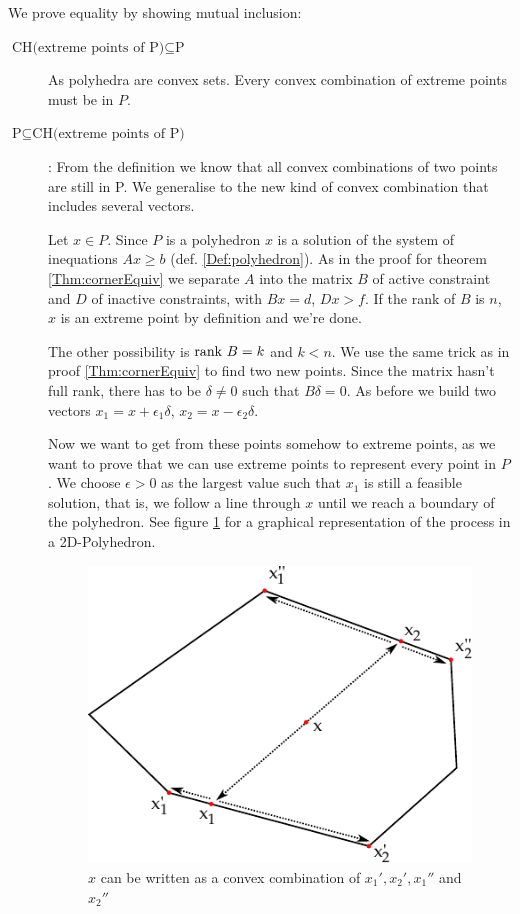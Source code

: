 \begin{pr} We prove equality by showing mutual inclusion:
\begin{description}
\item[$\text{CH(extreme points of P)} \subseteq \text{P}$] As polyhedra are convex sets. Every convex combination of extreme points must be in $P$.\\ 
\item[$\text{P} \subseteq \text{CH(extreme points of P)}$]:  From the definition we know that all convex combinations of two points are still in P. We generalise to the new kind of convex combination that includes several vectors. 

Let $x\in P$. Since $P$ is a polyhedron $x$ is a solution of the system of inequations $Ax\geq b$ (def. \ref{Def:polyhedron}). As in the proof for theorem \ref{Thm:cornerEquiv} we separate $A$ into the matrix $B$ of active constraint and $D$ of inactive constraints, with $Bx=d$, $Dx>f$. If the rank of $B$ is $n$, $x$ is an extreme point by definition and we're done. 

The other possibility is $\mbox{rank } B=k$ and $k<n$. We use the same trick as in proof \ref{Thm:cornerEquiv} to find two new points. Since the matrix hasn't full rank, there has to be $\delta \neq 0$ such that $B\delta = 0$. As before we build two vectors $x_1 = x+ \epsilon_1 \delta$, $x_2=x-\epsilon_2 \delta$. 

Now we want to get from these points somehow to extreme points, as we want to prove that we can use extreme points to represent every point in $P$. We choose $\epsilon>0$ as the largest value such that $x_1$ is still a feasible solution, that is, we follow a line through $x$ until we reach a boundary of the polyhedron. See figure \ref{Fig:convCombExPoints} for a graphical representation of the process in a 2D-Polyhedron.

\begin{figure}[hbt]
\begin{center}
\includegraphics{./images/convex_comb_extr_points.pdf}
\end{center}
\caption{$x$ can be written as a convex combination of $x_1',x_2', x_1''$ and $x_2''$}
\label{Fig:convCombExPoints}
\end{figure}


\end{description}
\end{pr}

